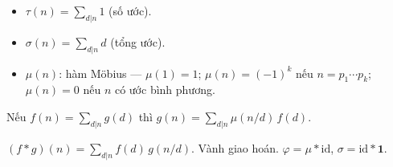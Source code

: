 \documentclass[12pt,a4paper]{article}
\begin{document}
\begin{dinhnghia}[title={Một số hàm số học quan trọng}]
  \begin{itemize}
    \item $\tau(n) = \sum_{d|n} 1$ (số ước).
    \item $\sigma(n) = \sum_{d|n} d$ (tổng ước).
    \item $\mu(n)$: hàm Möbius --- $\mu(1)=1$; $\mu(n) = (-1)^k$ nếu $n = p_1\cdots p_k$; $\mu(n) = 0$ nếu $n$ có ước bình phương.
  \end{itemize}
\end{dinhnghia}

\begin{dinhly}[title={Công thức nghịch đảo Möbius}]
  Nếu $f(n) = \sum_{d|n} g(d)$ thì $g(n) = \sum_{d|n} \mu(n/d)\,f(d)$.
\end{dinhly}

\begin{dinhly}[title={Tích chập Dirichlet}]
  $(f * g)(n) = \sum_{d|n} f(d)\,g(n/d)$. Vành giao hoán. $\varphi = \mu * \text{id}$, $\sigma = \text{id} * \mathbf{1}$.
\end{dinhly}
\end{document}
